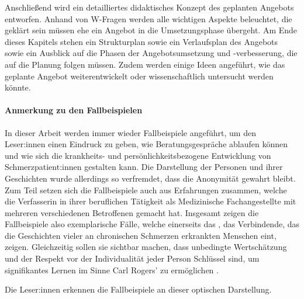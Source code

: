 \documentclass[
  twoside,
  parskip=half-,
  paper=176mm:246mm,
  BCOR=14mm,
  DIV=14,
]{scrreprt}
\begin{document}
Anschließend wird ein detailliertes didaktisches Konzept des geplanten Angebots entworfen. Anhand von W-Fragen werden alle wichtigen Aspekte beleuchtet, die geklärt sein müssen ehe ein Angebot in die Umsetzungsphase übergeht. Am Ende dieses Kapitels stehen ein Strukturplan sowie ein Verlaufsplan des Angebots sowie ein Ausblick auf die Phasen der Angebotsumsetzung und -verbesserung, die auf die Planung folgen müssen. Zudem werden einige Ideen angeführt, wie das geplante Angebot weiterentwickelt oder wissenschaftlich untersucht werden könnte.

\paragraph{Anmerkung zu den Fallbeispielen}In dieser Arbeit werden immer wieder Fallbeispiele angeführt, um den Leser:innen einen Eindruck zu geben, wie Beratungsgespräche ablaufen können und wie sich die krankheits- und persönlichkeitsbezogene Entwicklung von Schmerzpatient:innen gestalten kann. Die Darstellung der Personen und ihrer Geschichten wurde allerdings so verfremdet, dass die Anonymität gewahrt bleibt. Zum Teil setzen sich die Fallbeispiele auch aus Erfahrungen zusammen, welche die Verfasserin in ihrer beruflichen Tätigkeit als Medizinische Fachangestellte mit mehreren verschiedenen Betroffenen gemacht hat. Insgesamt zeigen die Fallbeispiele also exemplarische Fälle, welche einerseits das , das Verbindende, das die Geschichten vieler an chronischen Schmerzen erkrankten Menschen eint, zeigen. Gleichzeitig sollen sie sichtbar machen, dass unbedingte Wertschätzung und der Respekt vor der Individualität jeder Person Schlüssel sind, um signifikantes Lernen im Sinne Carl Rogers' zu ermöglichen \autocite[vgl.][153f.]{rogersLernenFreiheit}.

\begin{beispiel}
  Die Leser:innen erkennen die Fallbeispiele an dieser optischen Darstellung.
\end{beispiel}
\end{document}
